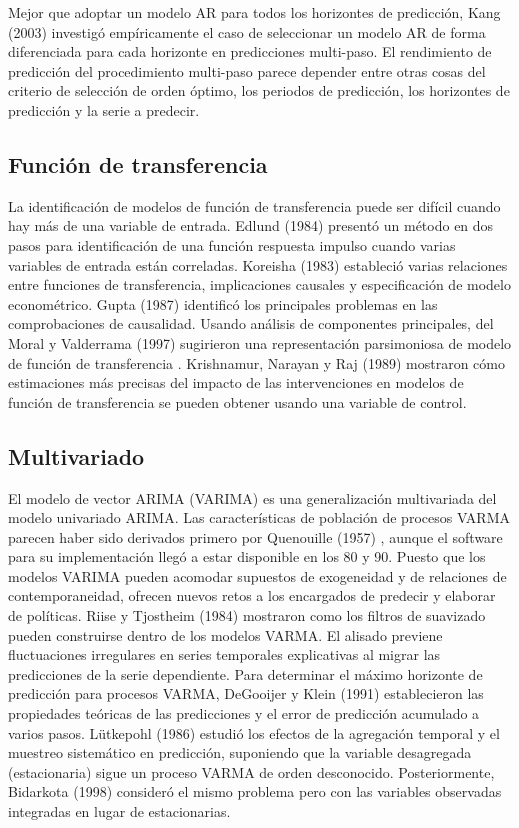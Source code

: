 \documentclass{llncs}
\begin{document}
Mejor que adoptar un modelo AR para todos los horizontes de predicción, Kang (2003) \cite{Kang2003387} investigó empíricamente el caso de seleccionar un modelo AR  de forma diferenciada para cada horizonte en predicciones multi-paso.
El rendimiento de predicción del procedimiento multi-paso parece depender entre otras cosas del criterio de selección de orden óptimo, los periodos de predicción, los horizontes de predicción y la serie a predecir.


\subsection{Función de transferencia}
La identificación de modelos de función de transferencia puede ser difícil cuando hay más de una variable de entrada. Edlund (1984) \cite{Edlund1984297} presentó un método en dos pasos para identificación de una función respuesta impulso cuando varias variables de entrada están correladas. Koreisha (1983) \cite{Koreisha1983151} estableció varias relaciones entre funciones de transferencia, implicaciones causales y especificación de modelo econométrico. Gupta (1987) \cite{Gupta1987195} identificó los principales problemas en las comprobaciones de causalidad. Usando análisis de componentes principales, del Moral y Valderrama (1997) \cite{DelMoral1997237} sugirieron una representación parsimoniosa de  modelo de función de transferencia . Krishnamur, Narayan y Raj (1989) \cite{Krishnamurthi198921} mostraron cómo estimaciones más precisas del impacto de las intervenciones en modelos de función de transferencia se pueden obtener usando una variable de control.

\subsection{Multivariado}
El modelo de vector ARIMA (VARIMA) es una generalización multivariada del modelo univariado ARIMA. Las características de población de procesos VARMA parecen haber sido derivados primero por Quenouille (1957) \cite{Quenouille1957}, aunque el software para su implementación llegó a estar disponible en los 80 y 90. Puesto que los modelos VARIMA pueden acomodar supuestos de exogeneidad y de relaciones de contemporaneidad, ofrecen nuevos retos a los encargados de predecir y elaborar de políticas. Riise y Tjostheim (1984) \cite{Riise1984309} mostraron como los filtros de suavizado pueden construirse dentro de los modelos VARMA. El alisado previene fluctuaciones irregulares en series temporales explicativas al migrar las predicciones de la serie dependiente. Para determinar el máximo horizonte de predicción para procesos VARMA, DeGooijer y Klein (1991) \cite{DeGooijer1992135} establecieron las propiedades teóricas de las predicciones y el error de predicción acumulado a varios pasos. Lütkepohl (1986) \cite{Lütkepohl1986461} estudió los efectos de la agregación temporal y el muestreo sistemático en predicción, suponiendo que la variable desagregada (estacionaria) sigue un proceso VARMA de orden desconocido. Posteriormente, Bidarkota (1998) \cite{Bidarkota1998457} consideró el mismo problema pero con las variables observadas integradas en lugar de estacionarias.
\end{document}
